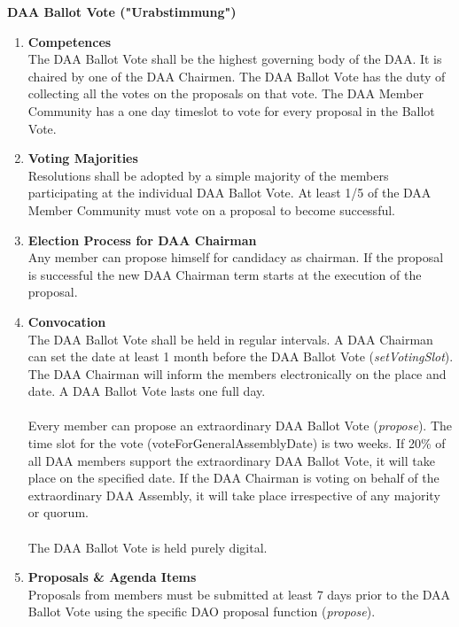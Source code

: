 \item \textbf{DAA Ballot Vote ("Urabstimmung")} \\
\begin{enumerate}[label=\textbf{\arabic*.}]
    \item \textbf{Competences} \\
    The DAA Ballot Vote shall be the highest governing body of the DAA.
    It is chaired by one of the DAA Chairmen.
    The DAA Ballot Vote has the duty of collecting all the votes on the proposals on that vote.
    The DAA Member Community has a one day timeslot to vote for every proposal in the Ballot Vote.

    \item \textbf{Voting Majorities} \\
    Resolutions shall be adopted by a simple majority of the members participating at the individual DAA Ballot Vote.
    At least 1/5 of the DAA Member Community must vote on a proposal to become successful.

    \item \textbf{Election Process for DAA Chairman} \\
    Any member can propose himself for candidacy as chairman.
    If the proposal is successful the new DAA Chairman term starts at the execution of the proposal.

    \item \textbf{Convocation} \\
    The DAA Ballot Vote shall be held in regular intervals.
    A DAA Chairman can set the date at least 1 month before the DAA Ballot Vote (\emph{setVotingSlot}).
    The DAA Chairman will inform the members electronically on the place and date.
    A DAA Ballot Vote lasts one full day. \\ \\

    Every member can propose an extraordinary DAA Ballot Vote (\emph{propose}).
    The time slot for the vote (voteForGeneralAssemblyDate) is two weeks.
    If 20\% of all DAA members support the extraordinary DAA Ballot Vote, it will take place on the specified date.
    If the DAA Chairman is voting on behalf of the extraordinary DAA Assembly, it will take place irrespective of any majority or quorum. \\ \\
    The DAA Ballot Vote is held purely digital.

    \item \textbf{Proposals \& Agenda Items} \\
    Proposals from members must be submitted at least 7 days prior to the DAA Ballot Vote using the specific DAO proposal function (\emph{propose}).
\end{enumerate}


